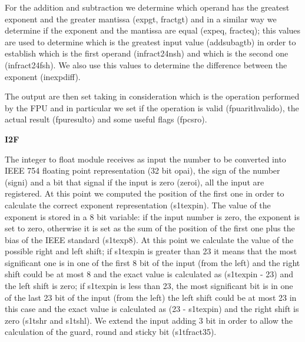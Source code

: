 For the addition and subtraction we determine which operand has the greatest exponent and the greater mantissa (exp\textunderscore gt, fract\textunderscore gt) and in a similar way we determine if the exponent and the mantissa are equal (exp\textunderscore eq, fract\textunderscore eq); this values are used to determine which is the greatest input value (addsub\textunderscore agtb) in order to establish which is the first operand (in\textunderscore fract24\textunderscore nsh) and which is the second one (in\textunderscore fract24\textunderscore fsh). We also use this values to determine the difference between the exponent (in\textunderscore exp\textunderscore diff).

The output are then set taking in consideration which is the operation performed by the FPU and in particular we set if the operation is valid (fpu\textunderscore arith\textunderscore valid\textunderscore o), the actual result (fpu\textunderscore result\textunderscore o) and some useful flags (fpcsr\textunderscore o).
\newline

\textbf{I2F}
\newline

The integer to float module receives as input the number to be converted into IEEE 754 floating point representation (32 bit opa\textunderscore i), the sign of the number (sign\textunderscore i) and a bit that signal if the input is zero (zero\textunderscore i), all the input are registered.
At this point we computed the position of the first one in order to calculate the correct exponent representation (s1t\textunderscore exp\textunderscore in). The value of the exponent is stored in a 8 bit variable: if the input number is zero, the exponent is set to zero, otherwise it is set as the sum of the position of the first one plus the bias of the IEEE standard (s1t\textunderscore exp8).
At this point we calculate the value of the possible right and left shift; if s1t\textunderscore exp\textunderscore in is greater than 23 it means that the most significant one is in one of the first 8 bit of the input (from the left) and the right shift could be at most 8 and the exact value is calculated as (s1t\textunderscore exp\textunderscore in - 23) and the left shift is zero; if s1t\textunderscore exp\textunderscore in is less than 23, the most significant bit is in one of the last 23 bit of the input (from the left) the left shift could be at most 23 in this case and the exact value is calculated as (23 - s1t\textunderscore exp\textunderscore in) and the right shift is zero (s1t\textunderscore shr and s1t\textunderscore shl).
We extend the input adding 3 bit in order to allow the calculation of the guard, round and sticky bit (s1t\textunderscore fract35).

